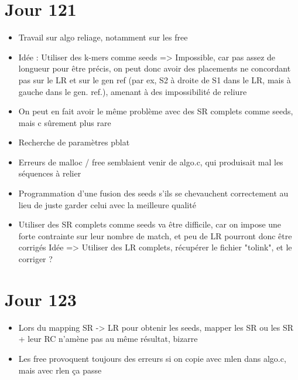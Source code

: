 \documentclass[12pt]{report}
\begin{document}
\section{Jour 121}

\begin{itemize}
	\item Travail sur algo reliage, notamment sur les free
	
	\item Idée : Utiliser des k-mers comme seeds
		  => Impossible, car pas assez de longueur pour être précis, on peut donc avoir des placements ne concordant pas sur le LR et sur le gen ref
		  (par ex, S2 à droite de S1 dans le LR, mais à gauche dans le gen. ref.), amenant à des impossibilité de reliure
		  
	\item On peut en fait avoir le même problème avec des SR complets comme seeds, mais c sûrement plus rare
	
	\item Recherche de paramètres pblat
	
	\item Erreurs de malloc / free semblaient venir de algo.c, qui produisait mal les séquences à relier
	
	\item Programmation d'une fusion des seeds s'ils se chevauchent correctement au lieu de juste garder celui avec la meilleure qualité
	
	\item Utiliser des SR complets comme seeds va être difficile, car on impose une forte contrainte sur leur nombre de match,
		  et peu de LR pourront donc être corrigés
		  Idée => Utiliser des LR complets, récupérer le fichier "tolink", et le corriger ?
\end{itemize}

\section{Jour 123}

\begin{itemize}
	\item Lors du mapping SR -> LR pour obtenir les seeds, mapper les SR ou les SR + leur RC n'amène pas au même résultat, bizarre

	\item Les free provoquent toujours des erreurs si on copie avec mlen dans algo.c, mais avec rlen ça passe
\end{itemize}
\end{document}
